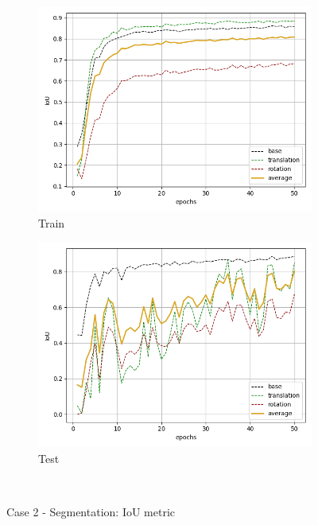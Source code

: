 \begin{figure}[H]
    \begin{subfigure}{.48\linewidth}
    \centering
    \includegraphics[scale=0.45]{Img/seg_noise_train_iou.png}
    \caption{Train}
    \end{subfigure}
    \begin{subfigure}{.48\linewidth}
    \centering
    \includegraphics[scale=0.45]{Img/seg_noise_test_iou.png}
    \caption{Test}
    \end{subfigure}\\
    \caption{Case 2 - Segmentation: IoU metric}
    \label{fig:seg_noise_iou}
\end{figure}
